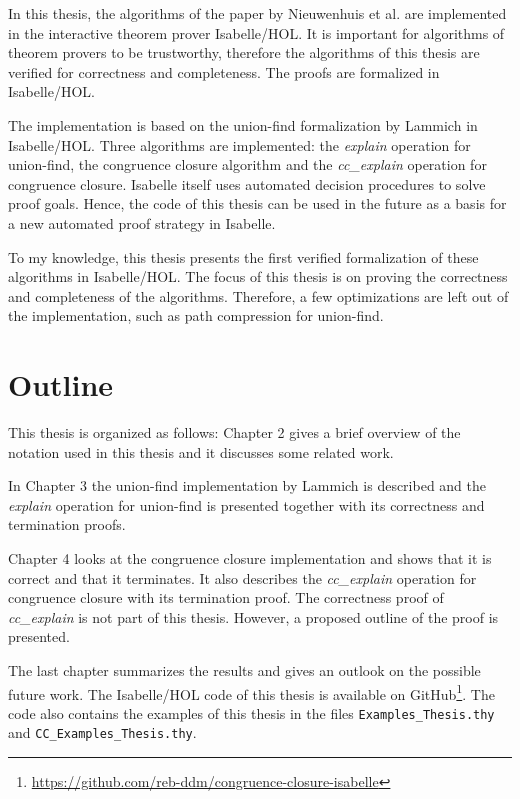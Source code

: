In this thesis, the algorithms of the paper by Nieuwenhuis et al. \cite{Nieuwenhuis} are implemented in the interactive theorem prover Isabelle/HOL.
It is important for algorithms of theorem provers to be trustworthy, therefore the algorithms of this thesis are verified for correctness and completeness.
The proofs are formalized in Isabelle/HOL.

The implementation is based on the union-find formalization by Lammich \cite{unionfind-isabelle} in Isabelle/HOL. Three algorithms are implemented: the \emph{explain} operation for union-find, the congruence closure algorithm and the \emph{cc\_explain} operation for congruence closure.
Isabelle itself uses automated decision procedures to solve proof goals.
Hence, the code of this thesis can be used in the future as a basis for a new automated proof strategy in Isabelle.

To my knowledge, this thesis presents the first verified formalization of these algorithms in Isabelle/HOL.
The focus of this thesis is on proving the correctness and completeness of the algorithms.
Therefore, a few optimizations are left out of the implementation, such as path compression for union-find.

\section{Outline}
This thesis is organized as follows: Chapter 2 gives a brief overview of the notation used in this thesis and it discusses some related work.

In Chapter 3 the union-find implementation by Lammich \cite{unionfind-isabelle} is described and the \emph{explain} operation for union-find is presented together with its correctness and termination proofs.

Chapter 4 looks at the congruence closure implementation and shows that it is correct and that it terminates. It also describes the \emph{cc\_explain} operation for congruence closure with its termination proof. The correctness proof of \emph{cc\_explain} is not part of this thesis. However, a proposed outline of the proof is presented.

The last chapter summarizes the results and gives an outlook on the possible future work.
The Isabelle/HOL code of this thesis is available on GitHub\footnote{\url{https://github.com/reb-ddm/congruence-closure-isabelle}}.
The code also contains the examples of this thesis in the files \lstinline|Examples_Thesis.thy| and \lstinline|CC_Examples_Thesis.thy|.

